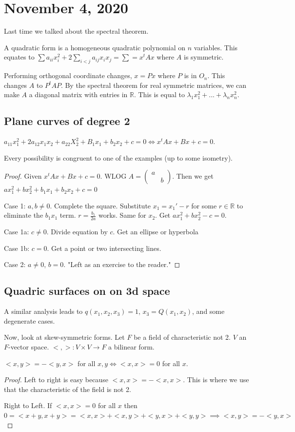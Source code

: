\documentclass{article}
\newcommand{\R}{\mathbb{R}}
\newcommand{\ra}[1][]{\xrightarrow{#1}}
\begin{document}
\section{November 4, 2020}
Last time we talked about the spectral theorem.
\begin{definition}
A quadratic form is a homogeneous quadratic polynomial on $n$ variables. This equates to $\sum a_{ii}x_i^2+2\sum_{i<j}a_{ij}x_ix_j=\sum=x^tAx$ where $A$ is symmetric.
\end{definition}
Performing orthogonal coordinate changes, $x=Px$ where $P$ is in $O_n$. This changes $A$ to $P^tAP$. By the spectral theorem for real symmetric matrices, we can make $A$ a diagonal matrix with entries in $\R$. This is equal to $\lambda_1x_1^2+...+\lambda_nx_n^2$.

\subsection{Plane curves of degree 2}
$a_11x_1^2+2a_{12}x_1x_2+a_22X_2^2+B_1x_1+b_2x_2+c=0\iff x^tAx+Bx+c=0$.
\begin{theorem}
Every possibility is congruent to one of the examples (up to some isometry).
\end{theorem}
\begin{proof}
Given $x^tAx+Bx+c=0$. WLOG $A=\begin{pmatrix}
a&\\&b
\end{pmatrix}$. Then we get $ax_1^2+bx_2^2+b_1x_1+b_2x_2+c=0$

Case 1: $a,b\neq 0$. Complete the square. Substitute $x_1=x_1'-r$ for some $r\in \R$ to eliminate the $b_1x_1$ term. $r=\frac{b_1}{2a}$ works. Same for $x_2$. Get $ax_1^2+bx_2^2-c=0$.

Case 1a: $c\neq 0$. Divide equation by $c$. Get an ellipse or hyperbola

Case 1b: $c=0$. Get a point or two intersecting lines.

Case 2: $a\neq 0$, $b=0$. "Left as an exercise to the reader."

\end{proof}
\subsection{Quadric surfaces on on 3d space}
A similar analysis leads to $q(x_1,x_2,x_3)=1$, $x_3=Q(x_1,x_2)$, and some degenerate cases.

Now, look at skew-symmetric forms. Let $F$ be a field of characteristic not 2. $V$ an $F$-vector space. $<,>:V\times V\ra F$ a bilinear form.
\begin{proposition}
$<x,y>=-<y,x>$ for all $x,y \iff <x,x>=0$ for all $x$.
\end{proposition}
\begin{proof}
Left to right is easy because $<x,x>=-<x,x>$. This is where we use that the characteristic of the field is not 2.

Right to Left. If $<x,x>=0$ for all $x$ then $0=<x+y,x+y>=<x,x>+<x,y>+<y,x>+<y,y>\implies <x,y>=-<y,x>$
\end{proof}
\end{document}

